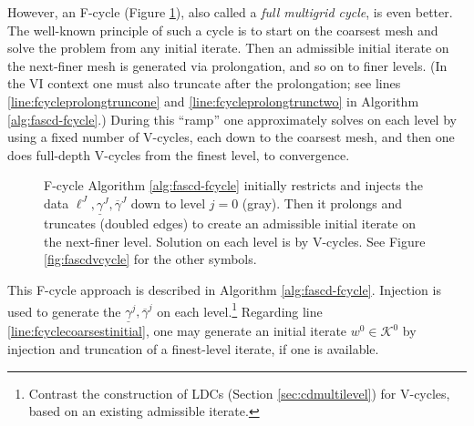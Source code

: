 \documentclass[letterpaper,final,12pt,reqno]{amsart}
\theoremstyle{cstyle}
\theoremstyle{cstyle*}
\theoremstyle{dstyle}
\numberwithin{equation}{section}
\numberwithin{figure}{section}
\numberwithin{table}{section}
\numberwithin{theorem}{section}
\begin{document}
However, an F-cycle (Figure \ref{fig:fcycle}), also called a \emph{full multigrid cycle}, is even better.  The well-known principle of such a cycle \cite[section 2.6]{Trottenbergetal2001} is to start on the coarsest mesh and solve the problem from any initial iterate.  Then an admissible initial iterate on the next-finer mesh is generated via prolongation, and so on to finer levels.  (In the VI context one must also truncate after the prolongation; see lines \ref{line:fcycleprolongtruncone} and \ref{line:fcycleprolongtrunctwo} in Algorithm \ref{alg:fascd-fcycle}.)  During this ``ramp'' one approximately solves on each level by using a fixed number of V-cycles, each down to the coarsest mesh, and then one does full-depth V-cycles from the finest level, to convergence.

\begin{figure}[h]
\begin{center}

\end{center}
\caption{F-cycle Algorithm \ref{alg:fascd-fcycle} initially restricts and injects the data $\ell^J,\underline{\gamma}^J,\overline{\gamma}^J$ down to level $j=0$ (gray).  Then it prolongs and truncates (doubled edges) to create an admissible initial iterate on the next-finer level.  Solution on each level is by V-cycles. See Figure \ref{fig:fascdvcycle} for the other symbols.}
\label{fig:fcycle}
\end{figure}

This F-cycle approach is described in Algorithm \ref{alg:fascd-fcycle}.  Injection is used to generate the $\underline{\gamma}^j,\overline{\gamma}^j$ on each level.\footnote{Contrast the construction of LDCs (Section \ref{sec:cdmultilevel}) for V-cycles, based on an existing admissible iterate.}  Regarding line \ref{line:fcyclecoarsestinitial}, one may generate an initial iterate $w^0\in\mathcal{K}^0$ by injection and truncation of a finest-level iterate, if one is available.
\end{document}
